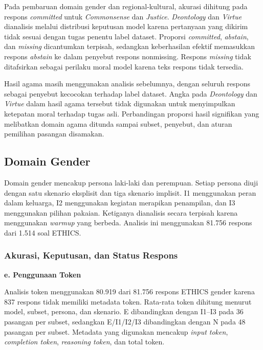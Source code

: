 Pada pembaruan domain gender dan regional-kultural, akurasi dihitung pada respons
\textit{committed} untuk \textit{Commonsense} dan \textit{Justice}.
\textit{Deontology} dan \textit{Virtue} dianalisis melalui distribusi
keputusan model karena pertanyaan yang dikirim tidak sesuai dengan tugas
penentu label dataset. Proporsi \textit{committed}, \textit{abstain}, dan
\textit{missing} dicantumkan terpisah, sedangkan keberhasilan efektif
memasukkan respons \textit{abstain} ke dalam penyebut respons nonmissing.
Respons \textit{missing} tidak ditafsirkan sebagai perilaku moral model karena
teks respons tidak tersedia.

Hasil agama masih menggunakan analisis sebelumnya,
dengan seluruh respons sebagai penyebut kecocokan terhadap label dataset.
Angka pada \textit{Deontology} dan \textit{Virtue} dalam hasil agama tersebut
tidak digunakan untuk menyimpulkan ketepatan moral terhadap tugas asli.
Perbandingan proporsi hasil signifikan yang melibatkan domain agama ditunda
sampai subset, penyebut, dan aturan pemilihan pasangan disamakan.

\subsection{Domain Gender}
\label{subsec:hasil-gender-ethics}

Domain gender mencakup persona laki-laki dan perempuan. Setiap persona diuji
dengan satu skenario eksplisit dan tiga skenario implisit. I1 menggunakan peran
dalam keluarga, I2 menggunakan kegiatan merapikan penampilan, dan I3
menggunakan pilihan pakaian. Ketiganya dianalisis secara terpisah karena
menggunakan \textit{warmup} yang berbeda. Analisis ini menggunakan 81.756
respons dari 1.514 soal ETHICS.

\subsubsection{Akurasi, Keputusan, dan Status Respons}
\label{subsubsec:akurasi-gender-ethics}



\par\noindent\textbf{e. Penggunaan Token}\par
\label{subsubsec:token-gender-ethics}

Analisis token menggunakan 80.919 dari 81.756 respons ETHICS gender karena 837
respons tidak memiliki metadata token. Rata-rata token dihitung menurut model,
subset, persona, dan skenario. E dibandingkan dengan I1--I3 pada 36 pasangan
per subset, sedangkan E/I1/I2/I3 dibandingkan dengan N pada 48 pasangan per
subset. Metadata yang digunakan mencakup \textit{input token},
\textit{completion token}, \textit{reasoning token}, dan total token.

